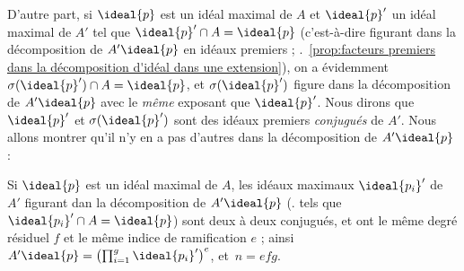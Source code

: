 \documentclass[11pt, useosf,
  title in boldface,
  theorem in new line,
  theorem numbering = section,
  number theorems separately,
]{simplivre}
\begin{document}
    D'autre part, si \( \ideal{p} \) est un idéal maximal de \( A \) et \( \ideal{p}' \) un idéal maximal de \( A' \) tel que \( \ideal{p}' \cap A = \ideal{p} \) (c'est-à-dire figurant dans la décomposition de \( A' \ideal{p} \) en idéaux premiers ; \cf.~\cref{prop:facteurs premiers dans la décomposition d'idéal dans une extension}), on a évidemment \( \sigma(\ideal{p}') \cap A = \ideal{p} \), et \( \sigma(\ideal{p}') \) figure dans la décomposition de \( A'\ideal{p} \) avec le \emph{même} exposant que \( \ideal{p}' \). Nous dirons que \( \ideal{p}' \) et \( \sigma(\ideal{p}') \) sont des idéaux premiers \emph{conjugués} de \( A' \). Nous allons montrer qu'il n'y en a pas d'autres dans la décomposition de \( A'\ideal{p} \) :
    \begin{proposition}\label{prop:décomposition dans une extension;conugués}
        Si \( \ideal{p} \) est un idéal maximal de \( A \), les idéaux maximaux \( \ideal{p_i}' \) de \( A' \) figurant dan la décomposition de \( A'\ideal{p} \) (\ie. tels que \( \ideal{p_i}' \cap A = \ideal{p} \)) sont deux à deux conjugués, et ont le même degré résiduel \( f \) et le même indice de ramification \( e \) ; ainsi \( A'\ideal{p} = \left(\prod_{i=1}^g \ideal{p_i}'\right)^e \), et~\( n = efg \).
    \end{proposition}
\end{document}

